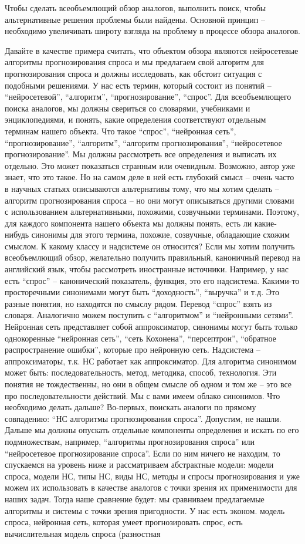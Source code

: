 \documentclass{report}
\begin{document}
Чтобы сделать всеобъемлющий обзор аналогов, выполнить поиск, чтобы альтернативные решения проблемы были найдены. Основной принцип – необходимо увеличивать широту взгляда на проблему в процессе обзора аналогов.

Давайте в качестве примера считать, что объектом обзора являются нейросетевые алгоритмы прогнозирования спроса и мы предлагаем свой алгоритм для прогнозирования спроса и должны исследовать, как обстоит ситуация с подобными решениями. У нас есть термин, который состоит из понятий – “нейросетевой”, “алгоритм”, “прогнозирование”, “спрос”. Для всеобъемлющего поиска аналогов, мы должны свериться со словарями, учебниками и энциклопедиями, и понять, какие определения соответствуют отдельным терминам нашего объекта. Что такое “спрос”, “нейронная сеть”, “прогнозирование”, “алгоритм”, “алгоритм прогнозирования”, “нейросетевое прогнозирование”. Мы должны рассмотреть все определения и выписать их отдельно. Это может показаться странным или очевидным. Возможно, автор уже знает, что это такое. Но на самом деле в ней есть глубокий смысл – очень часто в научных статьях описываются альтернативы тому, что мы хотим сделать – алгоритм прогнозирования спроса – но они могут описываться другими словами с использованием альтернативными, похожими, созвучными терминами. Поэтому, для каждого компонента нашего объекта мы должны понять, есть ли какие-нибудь синонимы для этого термина, похожие, созвучные, обладающие схожим смыслом. К какому классу и надсистеме он относится? Если мы хотим получить всеобъемлющий обзор, желательно получить правильный, каноничный перевод на английский язык, чтобы рассмотреть иностранные источники. Например, у нас есть “спрос” – канонический показатель, функция, это его надсистема. Какими-то просторечными синонимами могут быть “доходность”, “выручка” и т.д. Это разные понятия, но находятся по смыслу рядом. Перевод “спрос” взять из словаря. Аналогично можем поступить с “алгоритмом” и “нейронными сетями”. Нейронная сеть представляет собой аппроксиматор, синонимы могут быть только однокоренные “нейронная сеть”, “сеть Кохонена”, “персептрон”, “обратное распространение ошибки”, которые про нейронную сеть. Надсистема – аппроксиматоры, т.к. НС работает как аппроксиматор. Для алгоритма синонимом может быть: последовательность, метод, методика, способ, технология. Эти понятия не тождественны, но они в общем смысле об одном и том же – это все про последовательности действий. Мы с вами имеем облако синонимов. Что необходимо делать дальше? Во-первых, поискать аналоги по прямому совпадению: “НС алгоритмы прогнозирования спроса”. Допустим, не нашли. Дальше мы должны опускать отдельные компоненты определения и искать по его подмножествам, например, “алгоритмы прогнозирования спроса” или “нейросетевое прогнозирование спроса”. Если по ним ничего не находим, то спускаемся на уровень ниже и рассматриваем абстрактные модели: модели спроса, модели НС, типы НС, виды НС, методы и спросы прогнозирования и уже можем их использовать в качестве аналогов с точки зрения их применимости для наших задач. Тогда наше сравнение будет: мы сравниваем предлагаемые алгоритмы и системы с точки зрения пригодности. У нас есть эконом. модель спроса, нейронная сеть, которая умеет прогнозировать спрос, есть вычислительная модель спроса (разностная 
\end{document}
